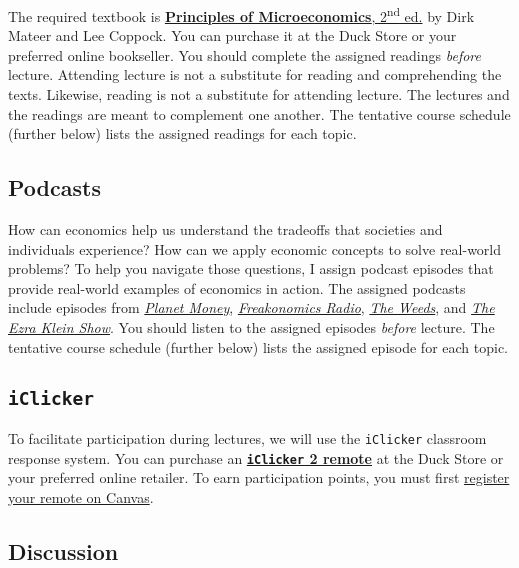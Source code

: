 \documentclass[11pt]{article}
\begin{document}
The required textbook is \href{https://www.amazon.com/Principles-Microeconomics-Second-Lee-Coppock/dp/0393614085}{\textbf{Principles of Microeconomics}, 2\textsuperscript{nd} ed.} by Dirk Mateer and Lee Coppock. You can purchase it at the Duck Store or your preferred online bookseller. You should complete the assigned readings \textit{before} lecture. Attending lecture is not a substitute for reading and comprehending the texts. Likewise, reading is not a substitute for attending lecture. The lectures and the readings are meant to complement one another. The tentative course schedule (further below) lists the assigned readings for each topic.

\subsection*{Podcasts}

How can economics help us understand the tradeoffs that societies and individuals experience? How can we apply economic concepts to solve real-world problems? To help you navigate those questions, I assign podcast episodes that provide real-world examples of economics in action. The assigned podcasts include episodes from \href{https://www.npr.org/sections/money/}{\textit{Planet Money}}, \href{https://www.npr.org/podcasts/452538045/freakonomics-radio}{\textit{Freakonomics Radio}}, \href{https://www.vox.com/the-weeds}{\textit{The Weeds}}, and \href{https://www.vox.com/ezra-klein-show-podcast}{\textit{The Ezra Klein Show}}. You should listen to the assigned episodes \textit{before} lecture. The tentative course schedule (further below) lists the assigned episode for each topic.

\subsection*{\texttt{iClicker}} 

To facilitate participation during lectures, we will use the \texttt{iClicker} classroom response system. You can purchase an \href{https://www.uoduckstore.com/Iclicker-2-142928047}{\textbf{\texttt{iClicker} 2 remote}} at the Duck Store or your preferred online retailer. To earn participation points, you must first \href{https://canvas.uoregon.edu/courses/26168/pages/enabling-browser-cookies-and-registering-i%3Eclickers?module_item_id=108448}{register your remote on Canvas}.



\subsection*{Discussion} 
\end{document}
